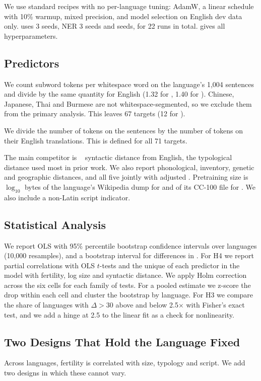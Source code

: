 We use standard recipes with no per-language tuning: AdamW, a linear schedule with 10\% warmup, mixed precision, and model selection on English dev data only.
\xnli uses 3 seeds, NER 3 seeds and  seeds, for 22 runs in total.
 gives all hyperparameters.

\subsection{Predictors}
We count subword tokens per whitespace word on the language's 1{,}004 \flores sentences and divide by the same quantity for English (1.32 for \mbert, 1.40 for \xlmr).
Chinese, Japanese, Thai and Burmese are not whitespace-segmented, so we exclude them from the primary analysis.
This leaves 67 targets (12 for \xnli).

We divide the number of tokens on the \flores sentences by the number of tokens on their English translations.
This is defined for all 71 targets.

The main competitor is \uriel~\cite{littell2017uriel} syntactic distance from English, the typological distance used most in prior work.
We also report phonological, inventory, genetic and geographic distances, and all five jointly with adjusted \rsq.
Pretraining size is $\log_{10}$ bytes of the language's Wikipedia dump for \mbert and of its CC-100 file for \xlmr.
We also include a non-Latin script indicator.

\subsection{Statistical Analysis}
We report OLS \rsq with 95\% percentile bootstrap confidence intervals over languages (10{,}000 resamples), and a bootstrap interval for differences in \rsq.
For H4 we report partial correlations with OLS $t$-tests and the unique \rsq of each predictor in the model with fertility, log size and syntactic distance.
We apply Holm correction across the six cells for each family of tests.
For a pooled estimate we z-score the drop within each cell and cluster the bootstrap by language.
For H3 we compare the share of languages with $\Delta>30$ above and below 2.5$\times$ with Fisher's exact test, and we add a hinge at 2.5 to the linear fit as a check for nonlinearity.

\subsection{Two Designs That Hold the Language Fixed}
Across languages, fertility is correlated with size, typology and script.
We add two designs in which these cannot vary.

